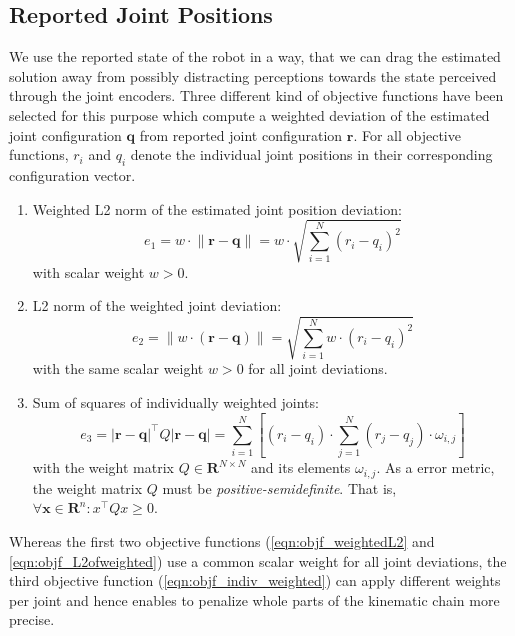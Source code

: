 \subsection{Reported Joint Positions}

We use the reported state of the robot in a way, that we can drag the estimated solution away from possibly distracting perceptions towards the state perceived through the joint encoders.
%
Three different kind of objective functions have been selected for this purpose which compute a weighted deviation of the estimated joint configuration $\mathbf{q}$ from reported joint configuration $\mathbf{r}$. For all objective functions, $r_i$ and $q_i$ denote the individual joint positions in their corresponding configuration vector.

\begin{enumerate}
\item Weighted L2 norm of the estimated joint position deviation:
\begin{equation}
e_1 = w \cdot \lVert \mathbf{r} - \mathbf{q} \rVert = w \cdot \sqrt{\sum_{i=1}^N (r_i - q_i)^2} \label{eqn:objf_weightedL2}
\end{equation}
with scalar weight $w>0$.

\item L2 norm of the weighted joint deviation:
\begin{equation}
e_2 = \lVert w \cdot (\mathbf{r} - \mathbf{q}) \rVert = \sqrt{\sum_{i=1}^N w \cdot (r_i - q_i)^2} \label{eqn:objf_L2ofweighted}
\end{equation}
with the same scalar weight $w>0$ for all joint deviations.

\item Sum of squares of individually weighted joints:
\begin{equation}
e_3 = \lvert \mathbf{r} - \mathbf{q} \rvert^\top Q \lvert \mathbf{r} - \mathbf{q} \rvert = \sum_{i=1}^N \left[ (r_i-q_i) \cdot \sum_{j=1}^N (r_j-q_j) \cdot \omega_{i,j} \right] \label{eqn:objf_indiv_weighted}
\end{equation}
with the weight matrix $Q\in\mathbf{R}^{N\times N}$ and its elements $\omega_{i,j}$. As a error metric, the weight matrix $Q$ must be \emph{positive-semidefinite}. That is, $\forall \mathbf{x}\in\mathbf{R}^n: x^\top Q x \geq 0$.
\end{enumerate}

Whereas the first two objective functions (\ref{eqn:objf_weightedL2} and \ref{eqn:objf_L2ofweighted}) use a common scalar weight for all joint deviations, the third objective function (\ref{eqn:objf_indiv_weighted}) can apply different weights per joint and hence enables to penalize whole parts of the kinematic chain more precise.

